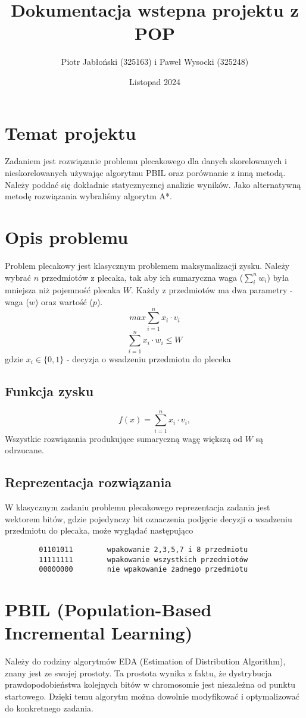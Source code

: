 \documentclass[11pt]{article}
\author{Piotr Jabłoński (325163) i Paweł Wysocki (325248)}
\date{Listopad 2024}
\title{Dokumentacja wstepna projektu z POP}
\begin{document}
\maketitle
\tableofcontents

\pagebreak
\section{Temat projektu}
\label{sec:org639b999}
Zadaniem jest rozwiązanie problemu plecakowego dla danych skorelowanych i nieskorelowanych używając algorytmu PBIL oraz porównanie z inną metodą. Należy poddać się dokładnie statycznycznej analizie wyników. Jako alternatywną metodę rozwiązania wybraliśmy algorytm A*.
\section{Opis problemu}
\label{sec:org22973a0}
Problem plecakowy jest klasycznym problemem maksymalizacji zysku. Należy wybrać \(n\) przedmiotów z plecaka, tak aby ich sumaryczna waga (\(\sum_i^n{w_i}\)) była mniejsza niż pojemność plecaka \(W\). Każdy z przedmiotów ma dwa parametry - waga (\(w\)) oraz wartość (\(p\)).
$$
        max \sum_{i=1}^n{x_i \cdot v_i}
$$
$$
        \sum_{i=1}^n{x_i \cdot w_i} \leq W
$$
gdzie \(x_i \in \{0, 1\}\) - decyzja o wsadzeniu przedmiotu do pleceka
\subsection{Funkcja zysku}
\label{sec:orge60c00e}
$$
        f(x) = \sum_{i=1}^n{x_i \cdot v_i},
$$
Wszystkie rozwiązania produkujące sumaryczną wagę większą od \(W\) są odrzucane.
\subsection{Reprezentacja rozwiązania}
\label{sec:org9d66316}
W klasycznym zadaniu problemu plecakowego reprezentacja zadania jest wektorem bitów, gdzie pojedynczy bit oznaczenia podjęcie decyzji o wsadzeniu przedmiotu do plecaka, może wyglądać następująco
\begin{verbatim}
        01101011        wpakowanie 2,3,5,7 i 8 przedmiotu
        11111111        wpakowanie wszystkich przedmiotów
        00000000        nie wpakowanie żadnego przedmiotu
\end{verbatim}

\pagebreak
\section{PBIL (Population-Based Incremental Learning)}
\label{sec:org90c2bcd}
Należy do rodziny algorytmów EDA (Estimation of Distribution Algorithm), znany jest ze swojej prostoty. Ta prostota wynika z faktu, że dystrybucja prawdopodobieństwa kolejnych bitów w chromosomie jest niezależna od punktu startowego. Dzięki temu algorytm można dowolnie modyfikować i optymalizować do konkretnego zadania.
\end{document}
